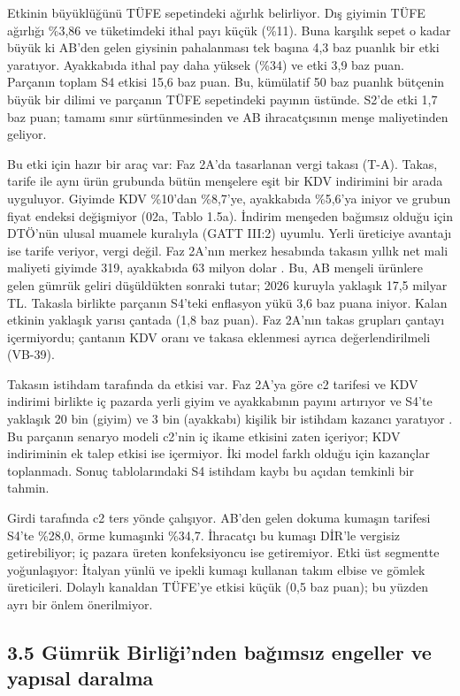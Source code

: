 Etkinin büyüklüğünü TÜFE sepetindeki ağırlık belirliyor. Dış giyimin TÜFE ağırlığı \%3,86 ve tüketimdeki ithal payı küçük (\%11). Buna karşılık sepet o kadar büyük ki AB'den gelen giysinin pahalanması tek başına 4,3 baz puanlık bir etki yaratıyor. Ayakkabıda ithal pay daha yüksek (\%34) ve etki 3,9 baz puan. Parçanın toplam S4 etkisi 15,6 baz puan. Bu, kümülatif 50 baz puanlık bütçenin büyük bir dilimi ve parçanın TÜFE sepetindeki payının üstünde. S2'de etki 1,7 baz puan; tamamı sınır sürtünmesinden ve AB ihracatçısının menşe maliyetinden geliyor.

Bu etki için hazır bir araç var: Faz 2A'da tasarlanan vergi takası (T-A). Takas, tarife ile aynı ürün grubunda bütün menşelere eşit bir KDV indirimini bir arada uyguluyor. Giyimde KDV \%10'dan \%8,7'ye, ayakkabıda \%5,6'ya iniyor ve grubun fiyat endeksi değişmiyor (02a, Tablo 1.5a). İndirim menşeden bağımsız olduğu için DTÖ'nün ulusal muamele kuralıyla (GATT III:2) uyumlu. Yerli üreticiye avantajı ise tarife veriyor, vergi değil. Faz 2A'nın merkez hesabında takasın yıllık net mali maliyeti giyimde 319, ayakkabıda 63 milyon dolar \etiketT{}. Bu, AB menşeli ürünlere gelen gümrük geliri düşüldükten sonraki tutar; 2026 kuruyla yaklaşık 17,5 milyar TL. Takasla birlikte parçanın S4'teki enflasyon yükü 3,6 baz puana iniyor. Kalan etkinin yaklaşık yarısı çantada (1,8 baz puan). Faz 2A'nın takas grupları çantayı içermiyordu; çantanın KDV oranı ve takasa eklenmesi ayrıca değerlendirilmeli \etiketD{} (VB-39).

Takasın istihdam tarafında da etkisi var. Faz 2A'ya göre c2 tarifesi ve KDV indirimi birlikte iç pazarda yerli giyim ve ayakkabının payını artırıyor ve S4'te yaklaşık 20 bin (giyim) ve 3 bin (ayakkabı) kişilik bir istihdam kazancı yaratıyor \etiketT{}. Bu parçanın senaryo modeli c2'nin iç ikame etkisini zaten içeriyor; KDV indiriminin ek talep etkisi ise içermiyor. İki model farklı olduğu için kazançlar toplanmadı. Sonuç tablolarındaki S4 istihdam kaybı bu açıdan temkinli bir tahmin.

Girdi tarafında c2 ters yönde çalışıyor. AB'den gelen dokuma kumaşın tarifesi S4'te \%28,0, örme kumaşınki \%34,7. İhracatçı bu kumaşı DİR'le vergisiz getirebiliyor; iç pazara üreten konfeksiyoncu ise getiremiyor. Etki üst segmentte yoğunlaşıyor: İtalyan yünlü ve ipekli kumaşı kullanan takım elbise ve gömlek üreticileri. Dolaylı kanaldan TÜFE'ye etkisi küçük (0,5 baz puan); bu yüzden ayrı bir önlem önerilmiyor.

\hypertarget{nace_kartlar_13-15-35-guxfcmruxfck-birliux11finden-baux11fux131msux131z-engeller-ve-yapux131sal-daralma}{%
\subsection{3.5 Gümrük Birliği'nden bağımsız engeller ve yapısal daralma}\label{nace_kartlar_13-15-35-guxfcmruxfck-birliux11finden-baux11fux131msux131z-engeller-ve-yapux131sal-daralma}}

